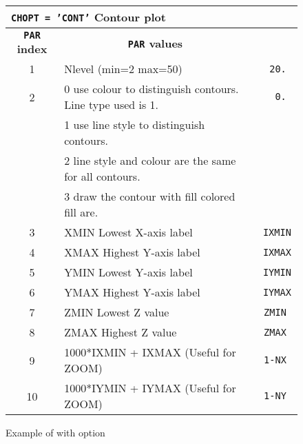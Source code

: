\begin{figure}[p]
\begin{center}
\begin{tabular}{||c|p{12cm}|>{\tt}r||}
\hline
\multicolumn{3}{||l||}{\bf {\tt CHOPT = 'CONT'} Contour plot}
\\
\hline
\multicolumn{1}{||c|}{\bf {\tt PAR} index}        &
\multicolumn{1}{c|}{\bf {\tt PAR} values}         &
\multicolumn{1}{c||}{\bf default}                \\
\hline
 1   & Nlevel (min=2 max=50)                                        &   20.   \\
 2   & 0 use colour to distinguish contours. Line type used is 1.   &    0.   \\
     & 1 use line style to distinguish contours.                    &         \\
     & 2 line style and colour are the same for all contours.       &         \\
     & 3 draw the contour with fill colored fill are.               &         \\
 3   & XMIN Lowest X-axis label                                     &   IXMIN \\
 4   & XMAX Highest Y-axis label                                    &   IXMAX \\
 5   & YMIN Lowest Y-axis label                                     &   IYMIN \\
 6   & YMAX Highest Y-axis label                                    &   IYMAX \\
 7   & ZMIN Lowest Z value                                          &   ZMIN  \\
 8   & ZMAX Highest Z value                                         &   ZMAX  \\
 9   & 1000*IXMIN + IXMAX (Useful for ZOOM)                         &   1-NX  \\
 10  & 1000*IYMIN + IYMAX (Useful for ZOOM)                         &   1-NY  \\
\hline
\end{tabular}
\end{center}
\bigskip
\begin{center} \mbox{} \end{center}
\caption{Example of \protect{} with \protect{} option}
\end{figure}

